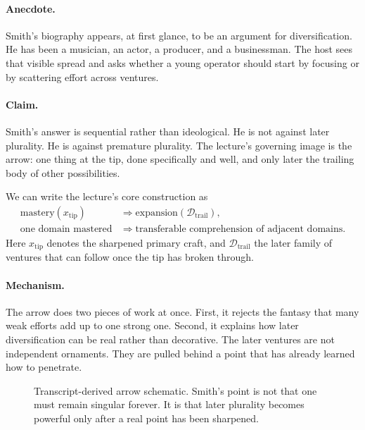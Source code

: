 \paragraph{Anecdote.}
Smith's biography appears, at first glance, to be an argument for diversification. He has been a musician, an actor, a producer, and a businessman. The host sees that visible spread and asks whether a young operator should start by focusing or by scattering effort across ventures.

\paragraph{Claim.}
Smith's answer is sequential rather than ideological. He is not against later plurality. He is against premature plurality. The lecture's governing image is the arrow: one thing at the tip, done specifically and well, and only later the trailing body of other possibilities.

We can write the lecture's core construction as
\begin{align}
\text{mastery}(x_{\mathrm{tip}})
&\Longrightarrow
\text{expansion}(\mathcal D_{\mathrm{trail}}),\\
\text{one domain mastered}
&\Longrightarrow
\text{transferable comprehension of adjacent domains}.
\end{align}
Here \(x_{\mathrm{tip}}\) denotes the sharpened primary craft, and \(\mathcal D_{\mathrm{trail}}\) the later family of ventures that can follow once the tip has broken through.

\paragraph{Mechanism.}
The arrow does two pieces of work at once. First, it rejects the fantasy that many weak efforts add up to one strong one. Second, it explains how later diversification can be real rather than decorative. The later ventures are not independent ornaments. They are pulled behind a point that has already learned how to penetrate.

\begin{figure}[h]
\centering
{}
\caption{Transcript-derived arrow schematic. Smith's point is not that one must remain singular forever. It is that later plurality becomes powerful only after a real point has been sharpened.}
\end{figure}

